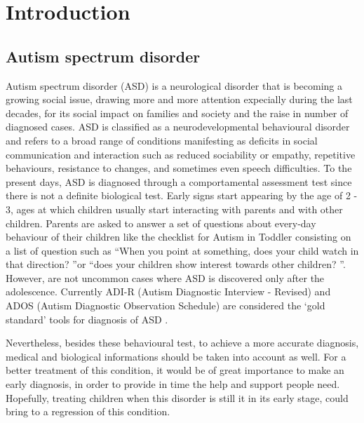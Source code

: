 \documentclass[11pt]{report}
\begin{document}


\chapter{Introduction}\label{chap:introduction}
\section{Autism spectrum disorder} \label{chap:autism}
Autism spectrum disorder (ASD) is a neurological disorder that is becoming a growing social issue, drawing more and more attention expecially during the last decades, for its social impact on families and society and the raise in number of diagnosed cases.
ASD is classified as a neurodevelopmental behavioural disorder \cite{guze-1995} \cite{who-1993} and refers to a broad range of conditions manifesting as deficits in social communication and interaction such as reduced sociability or empathy, repetitive behaviours, resistance to changes, and sometimes even speech difficulties.\cite{rapin-2008}
To the present days, ASD is diagnosed through a comportamental assessment test since there is not a definite biological test.
Early signs start appearing by the age of 2 - 3, ages at which children usually start interacting with parents and with other children.
Parents are asked to answer a set of questions about every-day behaviour of their children like the checklist for Autism in Toddler \cite{robins-2009} consisting on a list of question such as \textquotedblleft When you point at something, does your child watch in that direction? \textquotedblright or \textquotedblleft does your children show interest towards other children? \textquotedblright.
However, are not uncommon cases where ASD is discovered only after the adolescence.
Currently ADI-R (Autism Diagnostic Interview - Revised) and ADOS (Autism Diagnostic Observation Schedule) are considered the ‘gold standard’ tools for diagnosis of ASD \cite{ozonoff-2015} \cite{lecouteur-2008}.

Nevertheless, besides these behavioural test, to achieve a more accurate diagnosis, medical and biological informations should be taken into account as well.
For a better treatment of this condition, it would be of great importance to make an early diagnosis, in order to provide in time the help and support people need.
Hopefully, treating children when this disorder is still it in its early stage, could bring to a regression of this condition.
\end{document}
